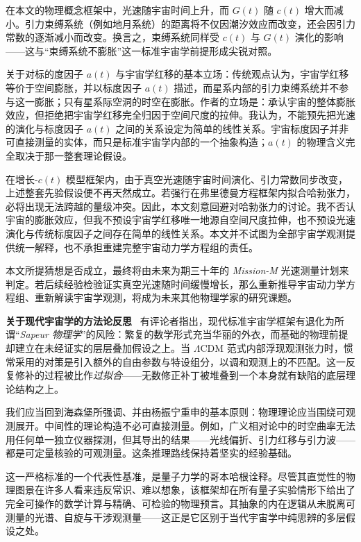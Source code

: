 \documentclass[12pt,leqno]{article}
\begin{document}
	\medskip
	在本文的物理概念框架中，光速随宇宙时间上升，而 $G(t)$ 随 $c(t)$ 增大而减小。引力束缚系统（例如地月系统）的距离将不仅因潮汐效应而改变，还会因引力常数的逐渐减小而改变。换言之，束缚系统同样受 $c(t)$ 与 $G(t)$ 演化的影响——这与“束缚系统不膨胀”这一标准宇宙学前提形成尖锐对照。
	
	\medskip
	关于对标的度因子 $a(t)$ 与宇宙学红移的基本立场：传统观点认为，宇宙学红移等价于空间膨胀，并以标度因子 $a(t)$ 描述，而星系内部的引力束缚系统并不参与这一膨胀；只有星系际空洞的时空在膨胀。作者的立场是：承认宇宙的整体膨胀效应，但拒绝把宇宙学红移完全归因于空间尺度的拉伸。我认为，不能预先把光速的演化与标度因子 $a(t)$ 之间的关系设定为简单的线性关系。宇宙标度因子并非可直接测量的实体，而只是标准宇宙学内部的一个抽象构造；$a(t)$ 的物理含义完全取决于那一整套理论假设。
	
	\medskip
	在增长-$c(t)$ 模型框架内，由于真空光速随宇宙时间演化、引力常数同步改变，上述整套先验假设便不再天然成立。若强行在弗里德曼方程框架内拟合哈勃张力，必将出现无法跨越的量级冲突。因此，本文刻意回避对哈勃张力的讨论。我不否认宇宙的膨胀效应，但我不预设宇宙学红移唯一地源自空间尺度拉伸，也不预设光速演化与传统标度因子之间存在简单的线性关系。本文并不试图为全部宇宙学观测提供统一解释，也不承担重建完整宇宙动力学方程组的责任。
	
	\medskip
	本文所提猜想是否成立，最终将由未来为期三十年的 \textit{Mission-M} 光速测量计划来判定。若后续经验检验证实真空光速随时间缓慢增长，那么重新推导宇宙动力学方程组、重新解读宇宙学观测，将成为未来其他物理学家的研究课题。
		
	
	\medskip
	\bigskip
	\textbf{关于现代宇宙学的方法论反思}\,\,\,
	有评论者指出，现代标准宇宙学框架有退化为所谓“\textit{Sapeur 物理学}”的风险：繁复的数学形式充当华丽的外衣，而基础的物理前提却建立在未经证实的层层叠加假设之上。当 $\Lambda$CDM 范式内部浮现观测张力时，惯常采用的对策是引入额外的自由参数与特设组分，以调和观测上的不匹配。这一反复修补的过程被比作\textit{过拟合}——无数修正补丁被堆叠到一个本身就有缺陷的底层理论结构之上。
		
	\medskip
	我们应当回到海森堡所强调、并由杨振宁重申的基本原则：物理理论应当围绕可观测展开。中间性的理论构造不必可直接测量。例如，广义相对论中的时空曲率无法用任何单一独立仪器探测，但其导出的结果——光线偏折、引力红移与引力波——都是可定量核验的可观测量。这条推理路线保持着坚实的经验基础。
		
	\medskip
	这一严格标准的一个代表性基准，是量子力学的哥本哈根诠释。尽管其直觉性的物理图景在许多人看来违反常识、难以想象，该框架却在所有量子实验情形下给出了完全可操作的数学计算与精确、可检验的物理预言。其抽象的内在逻辑从未脱离可测量的光谱、自旋与干涉观测量——这正是它区别于当代宇宙学中纯思辨的多层假设之处。
		
\end{document}

